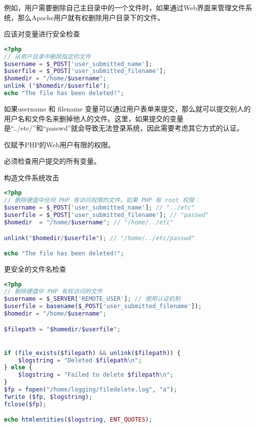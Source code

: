 例如，用户需要删除自己主目录中的一个文件时，如果通过Web界面来管理文件系统，那么Apache用户就有权删除用户目录下的文件。

\begin{example}
应该对变量进行安全检查
\begin{lstlisting}[language=PHP]
<?php
// 从用户目录中删除指定的文件
$username = $_POST['user_submitted_name'];
$userfile = $_POST['user_submitted_filename'];
$homedir = "/home/$username";
unlink ("$homedir/$userfile");
echo "The file has been deleted!";
\end{lstlisting}
\end{example}

如果username 和 filename 变量可以通过用户表单来提交，那么就可以提交别人的用户名和文件名来删掉他人的文件。这里，如果提交的变量是“../etc/”和“passwd”就会导致无法登录系统，因此需要考虑其它方式的认证。

\begin{compactitem}
\item 仅赋予PHP的Web用户有限的权限。
\item 必须检查用户提交的所有变量。
\end{compactitem}



\begin{example}
构造文件系统攻击
\begin{lstlisting}[language=PHP]
<?php
// 删除硬盘中任何 PHP 有访问权限的文件。如果 PHP 有 root 权限：
$username = $_POST['user_submitted_name']; // "../etc"
$userfile = $_POST['user_submitted_filename']; // "passwd"
$homedir  = "/home/$username"; // "/home/../etc"

unlink("$homedir/$userfile"); // "/home/../etc/passwd"

echo "The file has been deleted!";
\end{lstlisting}
\end{example}


\begin{example}
更安全的文件名检查
\begin{lstlisting}[language=PHP]
<?php
// 删除硬盘中 PHP 有权访问的文件
$username = $_SERVER['REMOTE_USER']; // 使用认证机制
$userfile = basename($_POST['user_submitted_filename']);
$homedir = "/home/$username";

$filepath = "$homedir/$userfile";


if (file_exists($filepath) && unlink($filepath)) {
    $logstring = "Deleted $filepath\n";
} else {
    $logstring = "Failed to delete $filepath\n";
}
$fp = fopen("/home/logging/filedelete.log", "a");
fwrite ($fp, $logstring);
fclose($fp);

echo htmlentities($logstring, ENT_QUOTES);
\end{lstlisting}
\end{example}


